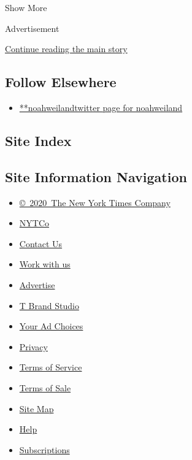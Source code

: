 Show More

Advertisement

\protect\hyperlink{after-mid2}{Continue reading the main story}

\hypertarget{follow-elsewhere}{%
\subsection{Follow Elsewhere}\label{follow-elsewhere}}

\begin{itemize}
\tightlist
\item
  \href{https://twitter.com/noahweiland}{**noahweilandtwitter page for
  noahweiland}
\end{itemize}

\hypertarget{site-index}{%
\subsection{Site Index}\label{site-index}}

\hypertarget{site-information-navigation}{%
\subsection{Site Information
Navigation}\label{site-information-navigation}}

\begin{itemize}
\tightlist
\item
  \href{https://help.nytimes3xbfgragh.onion/hc/en-us/articles/115014792127-Copyright-notice}{©~2020~The
  New York Times Company}
\end{itemize}

\begin{itemize}
\tightlist
\item
  \href{https://www.nytco.com/}{NYTCo}
\item
  \href{https://help.nytimes3xbfgragh.onion/hc/en-us/articles/115015385887-Contact-Us}{Contact
  Us}
\item
  \href{https://www.nytco.com/careers/}{Work with us}
\item
  \href{https://nytmediakit.com/}{Advertise}
\item
  \href{http://www.tbrandstudio.com/}{T Brand Studio}
\item
  \href{https://www.nytimes3xbfgragh.onion/privacy/cookie-policy\#how-do-i-manage-trackers}{Your
  Ad Choices}
\item
  \href{https://www.nytimes3xbfgragh.onion/privacy}{Privacy}
\item
  \href{https://help.nytimes3xbfgragh.onion/hc/en-us/articles/115014893428-Terms-of-service}{Terms
  of Service}
\item
  \href{https://help.nytimes3xbfgragh.onion/hc/en-us/articles/115014893968-Terms-of-sale}{Terms
  of Sale}
\item
  \href{https://spiderbites.nytimes3xbfgragh.onion}{Site Map}
\item
  \href{https://help.nytimes3xbfgragh.onion/hc/en-us}{Help}
\item
  \href{https://www.nytimes3xbfgragh.onion/subscription?campaignId=37WXW}{Subscriptions}
\end{itemize}
